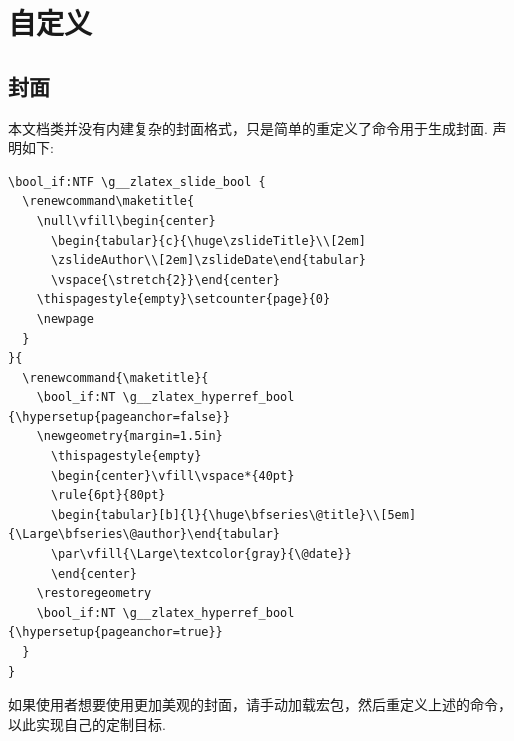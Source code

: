 \section{自定义}
\subsection{封面}
本文档类并没有内建复杂的封面格式，只是简单的重定义了\cmd{\maketitle}命令用于生成封面. 
声明如下:
\begin{verbatim}
\bool_if:NTF \g__zlatex_slide_bool {
  \renewcommand\maketitle{
    \null\vfill\begin{center}
      \begin{tabular}{c}{\huge\zslideTitle}\\[2em]
      \zslideAuthor\\[2em]\zslideDate\end{tabular}
      \vspace{\stretch{2}}\end{center}
    \thispagestyle{empty}\setcounter{page}{0}
    \newpage
  }
}{
  \renewcommand{\maketitle}{
    \bool_if:NT \g__zlatex_hyperref_bool {\hypersetup{pageanchor=false}}
    \newgeometry{margin=1.5in}
      \thispagestyle{empty}
      \begin{center}\vfill\vspace*{40pt}
      \rule{6pt}{80pt}
      \begin{tabular}[b]{l}{\huge\bfseries\@title}\\[5em]{\Large\bfseries\@author}\end{tabular}
      \par\vfill{\Large\textcolor{gray}{\@date}}
      \end{center}
    \restoregeometry
    \bool_if:NT \g__zlatex_hyperref_bool {\hypersetup{pageanchor=true}}
  }
}
\end{verbatim}

如果使用者想要使用更加美观的封面，请手动加载宏包，然后重定义上述的\cmd{\maketitle}命令，以此实现自己的定制目标.

